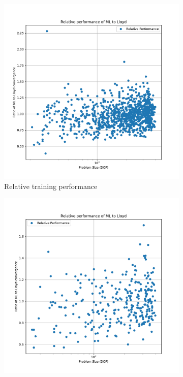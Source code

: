\documentclass{article}
\begin{document}
\begin{figure}[h]
  \centering
  \begin{subfigure}[t]{0.49\textwidth}
    \centering
    \includegraphics[width=\textwidth]{iso_rel_perf_train.pdf}
    \caption{Relative training performance}
  \end{subfigure}
  \begin{subfigure}[t]{0.49\textwidth}
    \centering
    \includegraphics[width=\textwidth]{iso_rel_perf_test.pdf}

\end{subfigure}
\end{figure}
\end{document}
